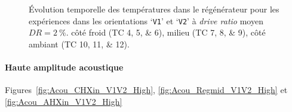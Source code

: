 \begin{figure}[!ht]
    \centering
	\begin{subfigure}{\textwidth}
		\centering
    	
		\caption{}
		\label{fig:Acou_CHXin_V1V2_Mid}
	\end{subfigure}		
	\begin{subfigure}{\textwidth}
		\centering
    	
		\caption{}
		\label{fig:Acou_Regmid_V1V2_Mid}
	\end{subfigure}		
	\begin{subfigure}{\textwidth}
		\centering
    	
		\caption{}
		\label{fig:Acou_AHXin_V1V2_Mid}
	\end{subfigure}		
    \caption{\'Evolution temporelle des températures dans le régénérateur pour les expériences dans les orientations `\texttt{V1}' et `\texttt{V2}' à \textit{drive ratio} moyen $DR=\qty{2}{\percent}$.  côté froid (TC \numlist{4;5;6}),  milieu (TC \numlist{7;8;9}),  côté ambiant (TC \numlist{10;11;12}).}
    \label{fig:Acou_V1V2_Mid}
\end{figure}

\paragraph*{Haute amplitude acoustique} Figures~\ref{fig:Acou_CHXin_V1V2_High}, \ref{fig:Acou_Regmid_V1V2_High} et \ref{fig:Acou_AHXin_V1V2_High}

%    

%    

